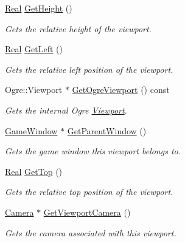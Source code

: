 \begin{DoxyCompactItemize}
\hyperlink{namespaceMezzanine_a726731b1a7df72bf3583e4a97282c6f6}{Real} \hyperlink{classMezzanine_1_1Viewport_a027005681b384d2bc39572ba725cfc65}{GetHeight} ()
\begin{DoxyCompactList}\small\item\em Gets the relative height of the viewport. \item\end{DoxyCompactList}\item 
\hyperlink{namespaceMezzanine_a726731b1a7df72bf3583e4a97282c6f6}{Real} \hyperlink{classMezzanine_1_1Viewport_a593954543d661785f8075b6d1bea9b0d}{GetLeft} ()
\begin{DoxyCompactList}\small\item\em Gets the relative left position of the viewport. \item\end{DoxyCompactList}\item 
Ogre::Viewport $\ast$ \hyperlink{classMezzanine_1_1Viewport_a54af912f78ca05aaab8dcea5465e61b9}{GetOgreViewport} () const 
\begin{DoxyCompactList}\small\item\em Gets the internal Ogre \hyperlink{classMezzanine_1_1Viewport}{Viewport}. \item\end{DoxyCompactList}\item 
\hyperlink{classMezzanine_1_1GameWindow}{GameWindow} $\ast$ \hyperlink{classMezzanine_1_1Viewport_a3da26dc1b30d984f1801b64e1052ad55}{GetParentWindow} ()
\begin{DoxyCompactList}\small\item\em Gets the game window this viewport belongs to. \item\end{DoxyCompactList}\item 
\hyperlink{namespaceMezzanine_a726731b1a7df72bf3583e4a97282c6f6}{Real} \hyperlink{classMezzanine_1_1Viewport_a0071bf5d6c9aaf4abb94179485d4fedd}{GetTop} ()
\begin{DoxyCompactList}\small\item\em Gets the relative top position of the viewport. \item\end{DoxyCompactList}\item 
\hyperlink{classMezzanine_1_1Camera}{Camera} $\ast$ \hyperlink{classMezzanine_1_1Viewport_a4665724d7b82f936e4c6b0e23d405c25}{GetViewportCamera} ()
\begin{DoxyCompactList}\small\item\em Gets the camera associated with this viewport. \item\end{DoxyCompactList}\item 

\end{DoxyCompactItemize}
